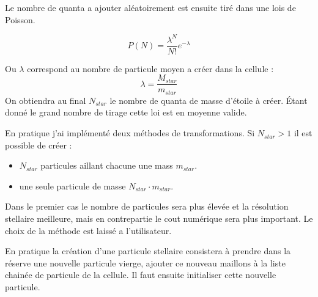 Le nombre de quanta a ajouter aléatoirement est ensuite tiré dans une lois de Poisson.

\begin{equation}
	P(N) = \frac{\lambda^N}{N!} e^{-\lambda}
\end{equation}

Ou $\lambda$ correspond au nombre de particule moyen a créer dans la cellule :
\begin{equation}
\lambda = \frac{ M_{star}}{m_{star}}
\end{equation}
On obtiendra au final $N_{star}$ le nombre de quanta de masse d'étoile à créer.
Étant donné le grand nombre de tirage cette loi est en moyenne valide.

En pratique j'ai implémenté deux méthodes de transformations.
Si  $N_{star}>1$ il est possible de créer : 
\begin{itemize}
\item  $N_{star}$ particules aillant chacune une mass  $m_{star}$.
\item une seule particule de masse  $N_{star} \cdot m_{star}$.
\end{itemize}

Dans le premier cas le nombre de particules sera plus élevée et la résolution stellaire meilleure, mais en contrepartie le cout numérique sera plus important.
Le choix de la méthode est laissé a l'utilisateur.


En pratique la création d'une particule stellaire consistera à prendre dans la réserve une nouvelle particule vierge, ajouter ce nouveau maillons à la liste chainée de particule de la cellule.
Il faut ensuite initialiser cette nouvelle particule.

